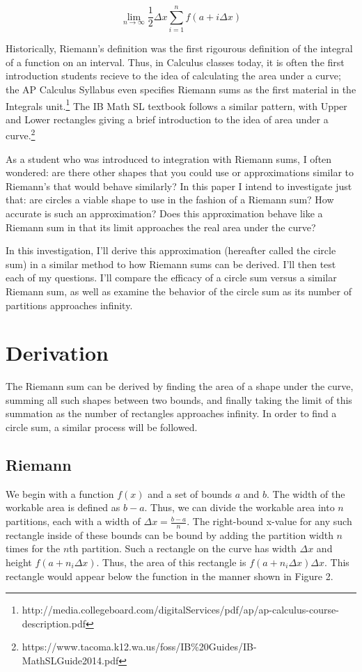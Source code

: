 \documentclass[12pt]{article}
\begin{document}
    \[ \displaystyle\lim_{n \to \infty}\frac{1}{2}\Delta x\sum_{i=1}^n f(a+i\Delta x) \]

    Historically, Riemann's definition was the first rigourous definition of the integral of a function on an interval.\cite{thomas96} Thus, in Calculus classes today, it is often the first introduction students recieve to the idea of calculating the area under a curve; the AP Calculus Syllabus even specifies Riemann sums as the first material in the Integrals unit.\footnote{http://media.collegeboard.com/digitalServices/pdf/ap/ap-calculus-course-description.pdf} The IB Math SL textbook follows a similar pattern, with Upper and Lower rectangles giving a brief introduction to the idea of area under a curve.\footnote{https://www.tacoma.k12.wa.us/foss/IB\%20Guides/IB-MathSLGuide2014.pdf}

    As a student who was introduced to integration with Riemann sums, I often wondered: are there other shapes that you could use or approximations similar to Riemann's that would behave similarly? In this paper I intend to investigate just that: are circles a viable shape to use in the fashion of a Riemann sum? How accurate is such an approximation? Does this approximation behave like a Riemann sum in that its limit approaches the real area under the curve?

    In this investigation, I'll derive this approximation (hereafter called the circle sum) in a similar method to how Riemann sums can be derived. I'll then test each of my questions. I'll compare the efficacy of a circle sum versus a similar Riemann sum, as well as examine the behavior of the circle sum as its number of partitions approaches infinity.

  \section{Derivation}
    The Riemann sum can be derived by finding the area of a shape under the curve, summing all such shapes between two bounds, and finally taking the limit of this summation as the number of rectangles approaches infinity. In order to find a circle sum, a similar process will be followed.

    \subsection{Riemann}
      We begin with a function \( f(x) \) and a set of bounds \( a \) and \( b \). The width of the workable area is defined as \( b-a \). Thus, we can divide the workable area into \( n \) partitions, each with a width of \( \Delta x = \frac{b-a}{n} \). The right-bound x-value for any such rectangle inside of these bounds can be bound by adding the partition width \( n \) times for the \(n\)th partition. Such a rectangle on the curve has width \( \Delta x \) and height \( f(a+n_i\Delta x) \). Thus, the area of this rectangle is \( f(a+n_i\Delta x)\Delta x \). This rectangle would appear below the function in the manner shown in Figure 2.
\end{document}
